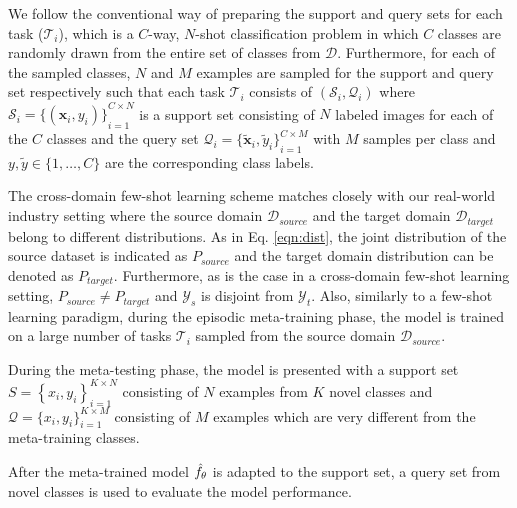 We follow the conventional way of preparing the support and query sets for each task ($\mathcal{T}_i$), which is a $C$-way, $N$-shot classification problem in which $C$ classes are randomly drawn from the entire set of classes from $\mathcal{D}$. Furthermore, for each of the sampled classes, $N$ and $M$ examples are sampled for the support and query set respectively such that each task $\mathcal{T}_i$ consists of $(\mathcal{S}_i, \mathcal{Q}_i)$ where $\mathcal{S}_i ={\{(\mathbf{x}_{i}, y_{i})\}}_{i=1}^{C \times N}$ is a support set consisting of $N$ labeled images for each of the $C$ classes and the query set $\mathcal{Q}_i = {\{\tilde{\mathbf{x}}_{i}, \tilde{y}_{i}\}}_{i=1}^{C \times M}$ with $M$ samples per class and $y, \tilde{y} \in\{1, \ldots, C\}$ are the corresponding class labels. 

The cross-domain few-shot learning scheme matches closely with our real-world industry setting where the source domain $\mathcal{D}_{source}$ and the target domain $\mathcal{D}_{target}$ belong to different distributions. As in   Eq. \ref{eqn:dist}, the joint distribution of the source dataset is indicated as $P_{source}$ and the target domain distribution can be denoted as $P_{target}$. Furthermore, as is the case in a  cross-domain few-shot learning setting,  $P_{source} \neq P_{target}$ and $\mathcal{Y}_{s}$ is disjoint from $\mathcal{Y}_{t}$. Also, similarly to a few-shot learning paradigm, during the episodic meta-training phase, the model is trained on a large number of tasks $\mathcal{T}_i$ sampled from the source domain $\mathcal{D}_{source}$. 

During the meta-testing phase, the model is presented with a support set $S=\left\{x_{i}, y_{i}\right\}_{i=1}^{K \times N}$ consisting of $N$ examples from $K$ novel classes and  $\mathcal{Q}=\{x_{i}, y_{i}\}_{i=1}^{K \times M}$ consisting of $M$ examples  which are very different from the meta-training classes.

After the meta-trained model $\mathnormal{\hat{f}_\theta}$ is adapted to the support set, a query set from novel classes is used to evaluate the model performance.


